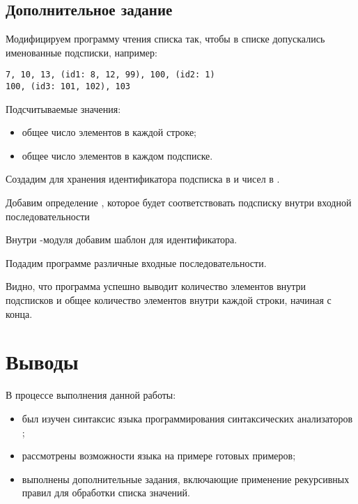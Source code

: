 \subsection{Дополнительное задание}

Модифицируем программу чтения списка так, чтобы в списке допускались именованные подсписки, например:

\begin{lstlisting}
7, 10, 13, (id1: 8, 12, 99), 100, (id2: 1)
100, (id3: 101, 102), 103
\end{lstlisting}

Подсчитываемые значения:

\begin{itemize}
	\item общее число элементов в каждой строке;
	\item общее число элементов в каждом подсписке.
\end{itemize}

Создадим  для хранения идентификатора подсписка в  и чисел в .

Добавим определение , которое будет соответствовать подсписку внутри входной последовательности


Внутри -модуля добавим шаблон для идентификатора.


Подадим программе различные входные последовательности. 




Видно, что программа успешно выводит количество элементов внутри подсписков и общее количество элементов внутри каждой строки, начиная с конца.

\section{Выводы}

В процессе выполнения данной работы:

\begin{itemize}
	\item был изучен синтаксис языка программирования синтаксических анализаторов ;
	\item рассмотрены возможности языка на примере готовых примеров;
	\item выполнены дополнительные задания, включающие применение рекурсивных правил для обработки списка значений.
\end{itemize}



